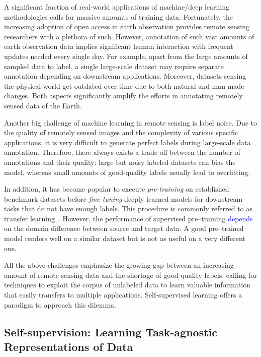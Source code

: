 \documentclass[lettersize,journal]{IEEEtran}
\begin{document}
A significant fraction of real-world applications of machine\slash deep learning methodologies calls for massive amounts of training data. Fortunately, the increasing adoption of open access in earth observation provides remote sensing researchers with a plethora of such. However, annotation of such vast amounts of earth observation data implies significant human interaction with frequent updates needed every single day. For example, apart from the large amounts of sampled data to label, a single large-scale dataset may require separate annotation depending on downstream applications. Moreover, datasets sensing the physical world get outdated over time due to both natural and man-made changes. Both aspects significantly amplify the efforts in annotating remotely sensed data of the Earth.

Another big challenge of machine learning in remote sensing is label noise. Due to the quality of remotely sensed images and the complexity of various specific applications, it is very difficult to generate perfect labels during large-scale data annotation. Therefore, there always exists a trade-off between the number of annotations and their quality: large but noisy labeled datasets can bias the model, whereas small amounts of good-quality labels usually lead to overfitting.

In addition, it has become popular to execute \textit{pre-training} on established benchmark datasets before \textit{fine-tuning} deeply learned models for downstream tasks that do not have enough labels. This procedure is commonly referred to as transfer learning~\cite{zhuang2020comprehensive}. However, the performance of supervised pre--training \textcolor{blue}{depends} on the domain difference between source and target data. A good pre--trained model renders well on a similar dataset but is not as useful on a very different one. 

All the above challenges emphasize the growing gap between an increasing amount of remote sensing data and the shortage of good-quality labels, calling for techniques to exploit the corpus of unlabeled data to learn valuable information that easily transfers to multiple applications. Self-supervised learning offers a paradigm to approach this dilemma.


\subsection{Self-supervision: Learning Task-agnostic Representations of Data}
\end{document}
